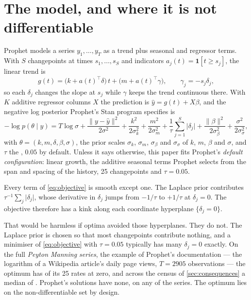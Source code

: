\section{The model, and where it is not differentiable}
\label{sec:model}

Prophet models a series $y_1,\dots,y_T$ as a trend plus seasonal and regressor
terms. With $S$ changepoints at times $s_1,\dots,s_S$ and indicators
$a_j(t) = \mathbf{1}[t \ge s_j]$, the linear trend is
\begin{equation}
  g(t) = \bigl(k + a(t)^\top \delta\bigr)\,t + \bigl(m + a(t)^\top \gamma\bigr),
  \qquad \gamma_j = -s_j \delta_j ,
  \label{eq:trend}
\end{equation}
so each $\delta_j$ changes the slope at $s_j$ while $\gamma$ keeps the trend
continuous there. With $K$ additive regressor columns $X$ the prediction is
$\hat y = g(t) + X\beta$, and the negative log posterior Prophet's Stan program
specifies is
\begin{equation}
  -\log p(\theta \mid y) =
    T \log\sigma + \frac{\lVert y - \hat y\rVert^2}{2\sigma^2}
    + \frac{k^2}{2\sigma_k^2} + \frac{m^2}{2\sigma_m^2}
    + \frac{1}{\tau}\sum_{j=1}^{S}\lvert\delta_j\rvert
    + \frac{\lVert\beta\rVert^2}{2\sigma_\beta^2}
    + \frac{\sigma^2}{2\sigma_\sigma^2},
  \label{eq:objective}
\end{equation}
with $\theta = (k, m, \delta, \beta, \sigma)$, the prior scales $\sigma_k$,
$\sigma_m$, $\sigma_\beta$ and $\sigma_\sigma$ of $k$, $m$, $\beta$ and $\sigma$, and
$\tau$ the , $0.05$ by default. Unless it says
otherwise, this paper fits Prophet's \emph{default configuration}: linear growth, the additive
seasonal terms Prophet selects from the span and spacing of the history, 25
changepoints and $\tau = 0.05$.

Every term of \eqref{eq:objective} is smooth except one. The Laplace prior
contributes $\tau^{-1}\sum_j \lvert\delta_j\rvert$, whose derivative in $\delta_j$
jumps from $-1/\tau$ to $+1/\tau$ at $\delta_j = 0$. The objective therefore has a
kink along each coordinate hyperplane $\{\delta_j = 0\}$.

That would be harmless if optima avoided those hyperplanes. They do not. The
Laplace prior is chosen so that most changepoints contribute nothing, and a
minimiser of \eqref{eq:objective} with $\tau = 0.05$ typically has many
$\delta_j = 0$ exactly. On the full \emph{Peyton Manning series}, the example of
Prophet's documentation --- the logarithm of a Wikipedia article's daily page views,
$T = 2905$ observations --- the optimum has \KktZerosPeyton{} of its 25 rates at zero,
and across the census of \cref{sec:consequences} a median of
\KktZerosCensusMedian. Prophet's solutions have
none, on any of the \KktSeries{} series.
The optimum lies on the non-differentiable set by design.

